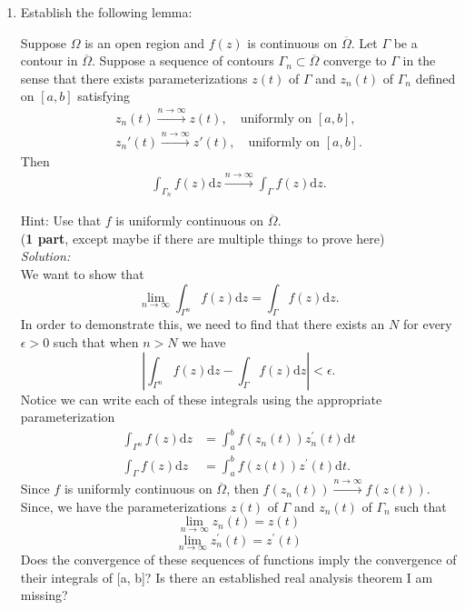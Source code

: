 \documentclass[10pt]{amsart}
\newcommand{\D}{\mathrm{d}}
\theoremstyle{nonumberplain}
\begin{document}
\begin{enumerate}[label={\bf {\arabic*}:}]
\newpage
\item Establish the following lemma:\\
    \begin{lemma}
      Suppose $\Omega$ is an open region and $f(z)$ is continuous on
      $\overline \Omega$.  Let $\Gamma$ be a contour in $\overline
      \Omega$.  Suppose a sequence of contours $\Gamma_n \subset
      \overline \Omega$ converge to
      $\Gamma$ in the sense that there exists parameterizations $z(t)$
      of $\Gamma$ and $z_n(t)$ of $\Gamma_n$ defined on $[a,b]$
      satisfying
      \begin{align*}
        z_n(t) \overset{n \to \infty}{\longrightarrow} z(t),  \quad \text{
        uniformly on } [a,b],\\
        z_n'(t) \overset{n \to \infty}{\longrightarrow} z'(t), \quad \text{
        uniformly on } [a,b].
      \end{align*}
      Then
      \begin{align*}
        \int_{\Gamma_n} f(z) \D z \overset{n \to
        \infty}{\longrightarrow}   \int_{\Gamma} f(z) \D z.
      \end{align*}
    \end{lemma}
    Hint: Use that $f$ is uniformly continuous on $\overline \Omega$.\\
(\textbf{1 part}, except maybe if there are multiple things to prove here) \\
\textit{Solution:} \\
We want to show that
$$
\lim_{n\rightarrow\infty} \int_{\Gamma^n} f(z) \D z = \int_{\Gamma} f(z) \D z.
$$
In order to demonstrate this, we need to find that there exists an $N$ for every $\epsilon > 0$ such that when $n > N$ we have
$$
\left| \int_{\Gamma^n} f(z) \D z - \int_{\Gamma} f(z) \D z \right| < \epsilon.
$$
Notice we can write each of these integrals using the appropriate parameterization
\begin{align*}
\int_{\Gamma^n} f(z) \D z &= \int_{a}^{b} f(z_n(t))z_n^\prime(t) \D t \\
\int_{\Gamma} f(z) \D z &= \int_{a}^{b} f(z(t))z^\prime(t) \D t.
\end{align*}
Since $f$ is uniformly continuous on $\overline \Omega$, then $f(z_n(t)) \overset{n \to \infty}{\longrightarrow} f(z(t))$.
Since, we have the parameterizations $z(t)$ of $\Gamma$ and $z_n(t)$ of $\Gamma_n$ such that
$$
\lim_{n\rightarrow\infty} z_n(t) = z(t)
$$
$$
\lim_{n\rightarrow\infty} z_n^{\prime}(t) = z^\prime(t)
$$
Does the convergence of these sequences of functions imply the convergence of their integrals of [a, b]?
Is there an established real analysis theorem I am missing?
\\


\end{enumerate}
\end{document}
